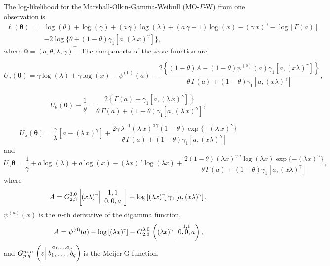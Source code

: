 \documentclass[twoside,leqno,11pt]{article}
\begin{document}
The log-likelihood for the Marshall-Olkin-Gamma-Weibull (MO-$\Gamma$-W) from one observation is
\begin{align}
\ell (\boldsymbol{\theta})=& \log (\theta)+\log (\gamma)+(a\,\gamma)\log (\lambda)+(a\,\gamma-1)\log(x)-(\gamma\, x)^\gamma-\log[\Gamma(a)]\nonumber \\ &-2\log\{\theta+(1-\theta)\gamma_1[a,(\lambda\,x)^\gamma]\},
\end{align}
where $\boldsymbol{\theta}=(a,\theta,\lambda,\gamma)^\top$. The components of the score function are

\begin{equation*}
U_{a}(\boldsymbol{\theta})=\gamma  \log (\lambda )+\gamma  \log (x)-\psi ^{(0)}(a)-\frac{2\left\{(1-\theta ) A-(1-\theta ) \psi ^{(0)}(a) \gamma_1 \left[a,(x \lambda
   )^{\gamma }\right]\right\}}{\theta\,\Gamma(a)+(1-\theta)\gamma_1\left[a,(x \lambda
   )^{\gamma }\right]},
\end{equation*}

\begin{equation*}
U_{\theta}(\boldsymbol{\theta})=\frac{1}{\theta}-\frac{2\left\{\Gamma(a)-\gamma_1\left[a,(\lambda\,x)^\gamma\right]\right\}}{\theta\,\Gamma(a)+(1-\theta)\gamma_1\left[a,(\lambda\,x)^\gamma\right]},
\end{equation*}

\begin{equation*}
U_{\lambda}(\boldsymbol{\theta})=\frac{\gamma }{\lambda }\left[a-(\lambda\,x)^\gamma\right]+\frac{2 \gamma \,\lambda^{-1}(\lambda\,x)^{a\,\gamma} (1-\theta )\exp\{-(\lambda\,x)^\gamma\} }{\theta \,\Gamma(a)+(1-\theta )
   \gamma_1 \left[a,(x \lambda )^{\gamma }\right]}
\end{equation*}
and
\begin{equation*}		
U_{\gamma}\boldsymbol{\theta}=\frac{1}{\gamma }+a \log (\lambda )+a \log (x)-(\lambda  x)^{\gamma } \log
   (\lambda  x)+\frac{2 (1-\theta )(\lambda
   x)^{\gamma\,a } \log (\lambda  x)\exp\{-(\lambda  x)^{\gamma }\}  }{\theta \,\Gamma(a)+(1-\theta )
   \gamma_1 \left[a,(x \lambda )^{\gamma }\right]},
\end{equation*}
where
\begin{align*}
A=G_{2,3}^{3,0}\left[(x \lambda )^{\gamma }\Big{|}
\begin{array}{c}
 1,1 \\
 0,0,a \\
\end{array}
\right]+\log \left[(\lambda  x)^{\gamma }\right] \gamma_1 \left[a,(x \lambda )^{\gamma
   }\right],
\end{align*}
$\psi^{(n)}(x)$ is the $n$-th derivative of the digamma function,
\begin{eqnarray*}
A=\psi^{(0)}(a) - \log\left[(\lambda x)^{\gamma}\right]-G^{3,0}_{2,3}\,\left((\lambda x)^{\gamma} \Big{|}	\stackrel{1,1}{0,0,a}\right),
\end{eqnarray*}
and $G^{m,n}_{p,q}\,\left(z \Big{|}	\stackrel{a_{1},\ldots,a_{p}}{b_{1},\ldots,b_{q}}\right)$ is the Meijer G function.
\end{document}
